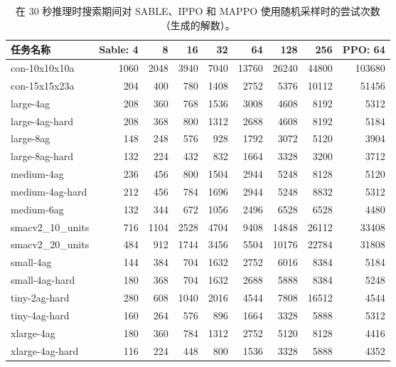 \documentclass[11pt,UTF8,fontset=fandol]{ctexart}
\begin{document}
\begin{table}[H]\centering
\caption{在 30 秒推理时搜索期间对 SABLE、IPPO 和 MAPPO 使用随机采样时的尝试次数（生成的解数）。}
\label{tab:15}
\small
\begin{tabular}{lrrrrrrrr}
\toprule
任务名称 & Sable: 4 & 8 & 16 & 32 & 64 & 128 & 256 & PPO: 64\\
\midrule
con-10x10x10a & 1060 & 2048 & 3940 & 7040 & 13760 & 26240 & 44800 & 103680\\
con-15x15x23a & 204 & 400 & 780 & 1408 & 2752 & 5376 & 10112 & 51456\\
large-4ag & 208 & 360 & 768 & 1536 & 3008 & 4608 & 8192 & 5312\\
large-4ag-hard & 208 & 368 & 800 & 1312 & 2688 & 4608 & 8192 & 5184\\
large-8ag & 148 & 248 & 576 & 928 & 1792 & 3072 & 5120 & 3904\\
large-8ag-hard & 132 & 224 & 432 & 832 & 1664 & 3328 & 3200 & 3712\\
medium-4ag & 236 & 456 & 800 & 1504 & 2944 & 5248 & 8128 & 5120\\
medium-4ag-hard & 212 & 456 & 784 & 1696 & 2944 & 5248 & 8832 & 5312\\
medium-6ag & 132 & 344 & 672 & 1056 & 2496 & 6528 & 6528 & 4480\\
smacv2\_10\_units & 716 & 1104 & 2528 & 4704 & 9408 & 14848 & 26112 & 33408\\
smacv2\_20\_units & 484 & 912 & 1744 & 3456 & 5504 & 10176 & 22784 & 31808\\
small-4ag & 144 & 384 & 704 & 1632 & 2752 & 6016 & 8384 & 5184\\
small-4ag-hard & 180 & 368 & 704 & 1632 & 2688 & 5888 & 8384 & 5248\\
tiny-2ag-hard & 280 & 608 & 1040 & 2016 & 4544 & 7808 & 16512 & 4544\\
tiny-4ag-hard & 160 & 264 & 576 & 896 & 1664 & 3328 & 5888 & 5312\\
xlarge-4ag & 180 & 360 & 784 & 1312 & 2752 & 5120 & 8128 & 4416\\
xlarge-4ag-hard & 116 & 224 & 448 & 800 & 1536 & 3328 & 5888 & 4352\\
\bottomrule
\end{tabular}
\end{table}
\end{document}
